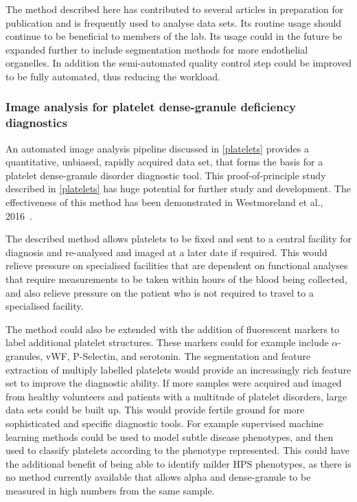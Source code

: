 The method described here has contributed to several articles in preparation for publication and is frequently used to analyse data sets. Its routine usage should continue to be beneficial to members of the lab. Its usage could in the future be expanded further to include segmentation methods for more endothelial organelles. In addition the semi-automated quality control step could be improved to be fully automated, thus reducing the workload.

\subsubsection{Image analysis for platelet dense-granule deficiency diagnostics}
An automated image analysis pipeline discussed in \autoref{platelets} provides a quantitative, unbiased, rapidly acquired data set, that forms the basis for a platelet dense-granule disorder diagnostic tool. This proof-of-principle study described in \autoref{platelets} has huge potential for further study and development. The effectiveness of this method has been demonstrated in Westmoreland et al., 2016~\cite{Westmoreland2016}.

The described method allows platelets to be fixed and sent to a central facility for diagnosis and re-analysed and imaged at a later date if required. This would relieve pressure on specialised facilities that are dependent on functional analyses that require measurements to be taken within hours of the blood being collected, and also relieve pressure on the patient who is not required to travel to a specialised facility. 

The method could also be extended with the addition of fluorescent markers to label additional platelet structures. These markers could for example include $\alpha$-granules, vWF, P-Selectin, and serotonin. The segmentation and feature extraction of multiply labelled platelets would provide an increasingly rich feature set to improve the diagnostic ability. If more samples were acquired and imaged from healthy volunteers and patients with a multitude of platelet disorders, large data sets could be built up. This would provide fertile ground for more sophisticated and specific diagnostic tools. For example supervised machine learning methods could be used to model subtle disease phenotypes, and then used to classify platelets according to the phenotype represented. This could have the additional benefit of being able to identify milder HPS phenotypes, as there is no method currently available that allows alpha and dense-granule to be measured in high numbers from the same sample.

